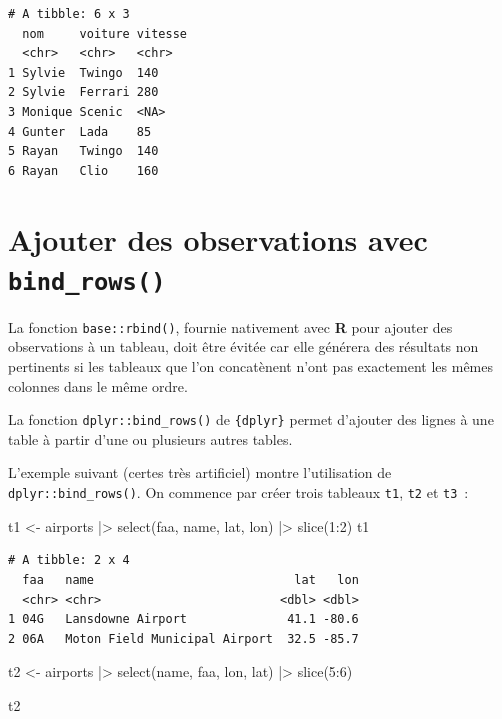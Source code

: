 \documentclass[
  letterpaper,
  DIV=11,
  numbers=noendperiod,
  oneside]{scrreprt}
\newenvironment{Shaded}{\begin{snugshade}}{\end{snugshade}}
\newcommand{\DecValTok}[1]{\textcolor[rgb]{0.68,0.00,0.00}{#1}}
\newcommand{\FunctionTok}[1]{\textcolor[rgb]{0.28,0.35,0.67}{#1}}
\newcommand{\NormalTok}[1]{\textcolor[rgb]{0.00,0.23,0.31}{#1}}
\newcommand{\OtherTok}[1]{\textcolor[rgb]{0.00,0.23,0.31}{#1}}
\newcommand{\SpecialCharTok}[1]{\textcolor[rgb]{0.37,0.37,0.37}{#1}}
\begin{document}
\begin{verbatim}
# A tibble: 6 x 3
  nom     voiture vitesse
  <chr>   <chr>   <chr>  
1 Sylvie  Twingo  140    
2 Sylvie  Ferrari 280    
3 Monique Scenic  <NA>   
4 Gunter  Lada    85     
5 Rayan   Twingo  140    
6 Rayan   Clio    160    
\end{verbatim}

\hypertarget{ajouter-des-observations-avec-bind_rows}{%
\section{\texorpdfstring{Ajouter des observations avec
\texttt{bind\_rows()}}{Ajouter des observations avec bind\_rows()}}\label{ajouter-des-observations-avec-bind_rows}}

La fonction \texttt{base::rbind()}, fournie nativement avec \textbf{R}
pour ajouter des observations à un tableau, doit être évitée car elle
générera des résultats non pertinents si les tableaux que l'on
concatènent n'ont pas exactement les mêmes colonnes dans le même ordre.

La fonction \texttt{dplyr::bind\_rows()} de \texttt{\{dplyr\}} permet
d'ajouter des lignes à une table à partir d'une ou plusieurs autres
tables.

L'exemple suivant (certes très artificiel) montre l'utilisation de
\texttt{dplyr::bind\_rows()}. On commence par créer trois tableaux
\texttt{t1}, \texttt{t2} et \texttt{t3}~:

\begin{Shaded}
\begin{Highlighting}[]
\NormalTok{t1 }\OtherTok{\textless{}{-}}\NormalTok{ airports }\SpecialCharTok{|\textgreater{}} 
  \FunctionTok{select}\NormalTok{(faa, name, lat, lon) }\SpecialCharTok{|\textgreater{}} 
  \FunctionTok{slice}\NormalTok{(}\DecValTok{1}\SpecialCharTok{:}\DecValTok{2}\NormalTok{)}
\NormalTok{t1}
\end{Highlighting}
\end{Shaded}

\begin{verbatim}
# A tibble: 2 x 4
  faa   name                            lat   lon
  <chr> <chr>                         <dbl> <dbl>
1 04G   Lansdowne Airport              41.1 -80.6
2 06A   Moton Field Municipal Airport  32.5 -85.7
\end{verbatim}

\begin{Shaded}
\begin{Highlighting}[]
\NormalTok{t2 }\OtherTok{\textless{}{-}}\NormalTok{ airports }\SpecialCharTok{|\textgreater{}} 
  \FunctionTok{select}\NormalTok{(name, faa, lon, lat) }\SpecialCharTok{|\textgreater{}} 
  \FunctionTok{slice}\NormalTok{(}\DecValTok{5}\SpecialCharTok{:}\DecValTok{6}\NormalTok{)}

\NormalTok{t2}
\end{Highlighting}
\end{Shaded}
\end{document}
